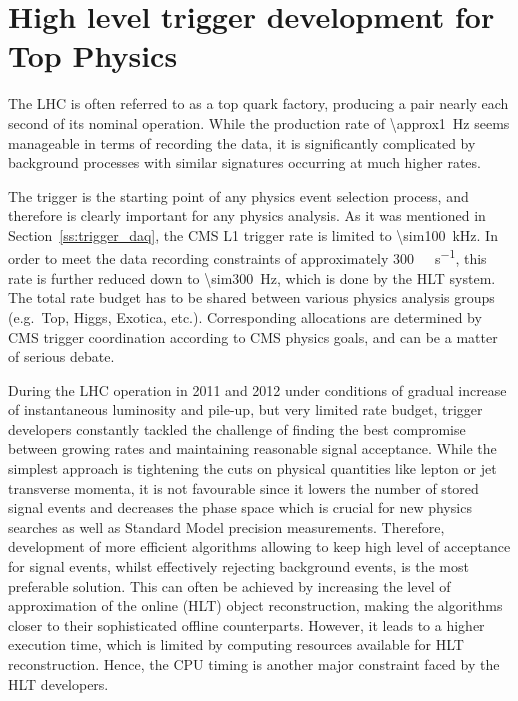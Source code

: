 
\chapter{High level trigger development for Top Physics}
\label{c:service_work}
\ifpdf
    \graphicspath{{04_Service_work/plots/}}
\else
    \graphicspath{{04_Service_work/plots/EPS/}{04_Service_work/plots/}}
\fi

The LHC is often referred to as a top quark factory, producing a \ttbar pair nearly each second of its nominal
operation. While the production rate of \SI{\approx1}{\Hz} seems manageable in terms of recording the data, it is
significantly complicated by background processes with similar signatures occurring at much higher rates.

The trigger is the starting point of any physics event selection process, and therefore is clearly important for any
physics analysis. As it was mentioned in Section~\ref{ss:trigger_daq}, the CMS L1 trigger rate is limited to
\SI{\sim100}{\kilo\hertz}. In order to meet the data recording constraints of approximately
\SI{300}{\mega\byte\per\second}, this rate is further reduced down to \SI{\sim300}{\Hz}, which is done by the HLT
system. The total rate budget has to be shared between various physics analysis groups (e.g.\ Top, Higgs, Exotica,
etc.). Corresponding allocations are determined by CMS trigger coordination according to CMS physics goals, and can be a
matter of serious debate.

During the LHC operation in 2011 and 2012 under conditions of gradual increase of instantaneous luminosity and pile-up,
but very limited rate budget, trigger developers constantly tackled the challenge of finding the best compromise between
growing rates and maintaining reasonable signal acceptance. While the simplest approach is tightening the cuts on
physical quantities like lepton or jet transverse momenta, it is not favourable since it lowers the number of stored
signal events and decreases the phase space which is crucial for new physics searches as well as Standard Model
precision measurements. Therefore, development of more efficient algorithms allowing to keep high level of acceptance
for signal events, whilst effectively rejecting background events, is the most preferable solution. This can often be
achieved by increasing the level of approximation of the online (HLT) object reconstruction, making the algorithms
closer to their sophisticated offline counterparts. However, it leads to a higher execution time, which is limited by
computing resources available for HLT reconstruction. Hence, the CPU timing is another major constraint faced by the HLT
developers.

